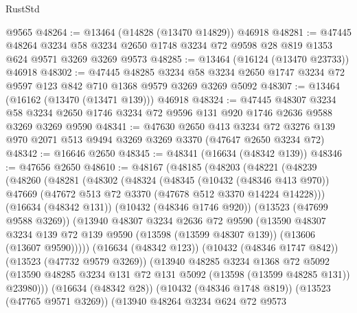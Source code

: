 \begin{lexlean}{RustStd}
\begin{coremodule}
    @9565
@48264 := @13464 (@14828 (@13470 @14829)) @46918
@48281 := @47445
    @48264
    @3234
    @58
    @3234
    @2650
    @1748
    @3234
    @72
    @9598
    @28
    @819
    @1353
    @624
    @9571
    @3269
    @3269
    @9573
@48285 := @13464 (@16124 (@13470 @23733)) @46918
@48302 := @47445
    @48285
    @3234
    @58
    @3234
    @2650
    @1747
    @3234
    @72
    @9597
    @123
    @842
    @710
    @1368
    @9579
    @3269
    @3269
    @5092
@48307 := @13464 (@16162 (@13470 (@13471 @139))) @46918
@48324 := @47445
    @48307
    @3234
    @58
    @3234
    @2650
    @1746
    @3234
    @72
    @9596
    @131
    @920
    @1746
    @2636
    @9588
    @3269
    @3269
    @9590
@48341 := @47630
    @2650
    @413
    @3234
    @72
    @3276
    @139
    @970
    @2071
    @513
    @9494
    @3269
    @3269
    @3370
    (@47647 @2650 @3234 @72)
@48342 := @16646 @2650
@48345 := @48341 (@16634 (@48342 @139))
@48346 := @47656 @2650
@48610 := @48167
    (@48185
      (@48203
        (@48221
          (@48239
            (@48260
              (@48281
                (@48302
                  (@48324
                    (@48345
                      (@10432 (@48346 @413 @970))
                      @47669
                      (@47672 @513 @72 @3370 (@47678 @512 @3370 @14224 @14228)))
                    (@16634 (@48342 @131))
                    (@10432 (@48346 @1746 @920))
                    (@13523 (@47699 @9588 @3269))
                    (@13940
                      @48307
                      @3234
                      @2636
                      @72
                      @9590
                      (@13590
                        @48307
                        @3234
                        @139
                        @72
                        @139
                        @9590
                        (@13598 (@13599 @48307 @139))
                        (@13606 (@13607 @9590)))))
                  (@16634 (@48342 @123))
                  (@10432 (@48346 @1747 @842))
                  (@13523 (@47732 @9579 @3269))
                  (@13940
                    @48285
                    @3234
                    @1368
                    @72
                    @5092
                    (@13590 @48285 @3234 @131 @72 @131 @5092 (@13598 (@13599 @48285 @131)) @23980)))
                (@16634 (@48342 @28))
                (@10432 (@48346 @1748 @819))
                (@13523 (@47765 @9571 @3269))
                (@13940
                  @48264
                  @3234
                  @624
                  @72
                  @9573

\end{coremodule}
\end{lexlean}

